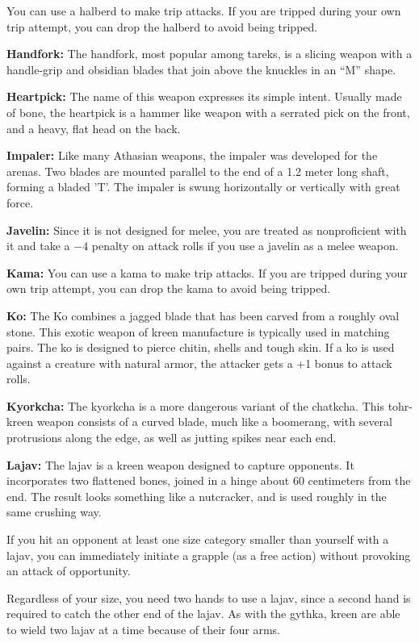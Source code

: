 You can use a halberd to make trip attacks. If you are tripped during your own trip attempt, you can drop the halberd to avoid being tripped. 

\textbf{Handfork:} The handfork, most popular among tareks, is a slicing weapon with a handle-grip and obsidian blades that join above the knuckles in an ``M'' shape.

\textbf{Heartpick:} The name of this weapon expresses its simple intent. Usually made of bone, the heartpick is a hammer like weapon with a serrated pick on the front, and a heavy, flat head on the back.

\textbf{Impaler:} Like many Athasian weapons, the impaler was developed for the arenas. Two blades are mounted parallel to the end of a 1.2 meter long shaft, forming a bladed 'T'. The impaler is swung horizontally or vertically with great force.

\textbf{Javelin:} Since it is not designed for melee, you are treated as nonproficient with it and take a $-4$ penalty on attack rolls if you use a javelin as a melee weapon. 

\textbf{Kama:} You can use a kama to make trip attacks. If you are tripped during your own trip attempt, you can drop the kama to avoid being tripped. 

\textbf{Ko:} The Ko combines a jagged blade that has been carved from a roughly oval stone. This exotic weapon of kreen manufacture is typically used in matching pairs. The ko is designed to pierce chitin, shells and tough skin. If a ko is used against a creature with natural armor, the attacker gets a +1 bonus to attack rolls.

\textbf{Kyorkcha:} The kyorkcha is a more dangerous variant of the chatkcha. This tohr-kreen weapon consists of a curved blade, much like a boomerang, with several protrusions along the edge, as well as jutting spikes near each end.

\textbf{Lajav:} The lajav is a kreen weapon designed to capture opponents. It incorporates two flattened bones, joined in a hinge about 60 centimeters from the end. The result looks something like a nutcracker, and is used roughly in the same crushing way.

If you hit an opponent at least one size category smaller than yourself with a lajav, you can immediately initiate a grapple (as a free action) without provoking an attack of opportunity.

Regardless of your size, you need two hands to use a lajav, since a second hand is required to catch the other end of the lajav. As with the gythka, kreen are able to wield two lajav at a time because of their four arms.

